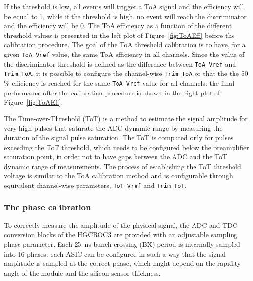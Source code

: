 If the threshold is low, all events will trigger a ToA signal and the efficiency will be equal to 1, while if the threshold is high, no event will reach the discriminator and the efficiency will be 0.
The ToA efficiency as a function of the different threshold values is presented in the left plot of Figure~\ref{fig:ToAEff} before the calibration procedure.
The goal of the ToA threshold calibration is to have, for a given \texttt{ToA\_Vref} value, the same ToA efficiency in all channels. 
Since the value of the discriminator threshold is defined as the difference between \texttt{ToA\_Vref} and \texttt{Trim\_ToA}, it is possible to configure the channel-wise \texttt{Trim\_ToA} so that the the 50$\%$ efficiency is reached for the same \texttt{ToA\_Vref} value for all channels: the final performance after the calibration procedure is shown in the right plot of Figure~\ref{fig:ToAEff}.

\bigbreak

The Time-over-Threshold (ToT) is a method to estimate the signal amplitude for very high pulses that saturate the ADC dynamic range by measuring the duration of the signal pulse saturation. 
The ToT is computed only for pulses exceeding the ToT threshold, which needs to be configured below the preamplifier saturation point, in order not to have gaps between the ADC and the ToT dynamic range of measurements. The process of establishing the ToT threshold voltage is similar to the ToA calibration method and is configurable through equivalent channel-wise parameters, \texttt{ToT\_Vref} and \texttt{Trim\_ToT}.


\subsubsection{The phase calibration}
\label{subsubsec:The phase calibration}

To correctly measure the amplitude of the physical signal, the ADC and TDC conversion blocks of the HGCROC3 are provided with an adjustable sampling phase parameter.
Each 25~ns bunch crossing (BX) period is internally sampled into 16 phases: each ASIC can be configured in such a way that the signal amplitude is sampled at the correct phase, which might depend on the rapidity angle of the module and the silicon sensor thickness.

